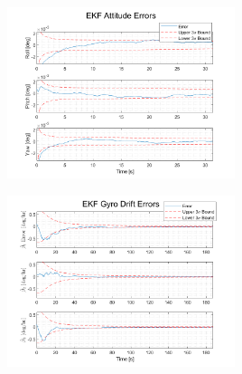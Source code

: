 \documentclass[12pt]{report}
\begin{document}
\begin{figure}[h!]
	\centering
	\begin{minipage}{.5\textwidth}
		\centering
		\includegraphics[height=5cm, keepaspectratio]{ekfAttErrBegin.png}
		\label{fig:ex1}
	\end{minipage}%
	\begin{minipage}{.5\textwidth}
		\centering
		\includegraphics[height=5cm, keepaspectratio]{ekfBiasErrBegin.png}
		\label{fig:ex2}
	\end{minipage}
\end{figure}
\end{document}
